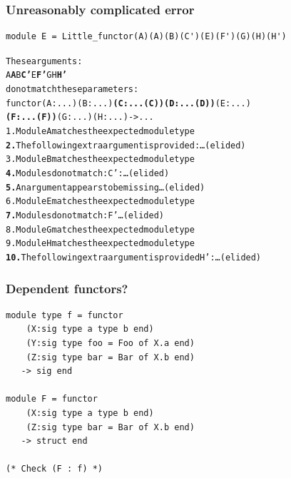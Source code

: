 \documentclass[11pt,aspectratio=169]{beamer}
\begin{document}
\begin{frame}[fragile]\frametitle{Unreasonably complicated error}
\begin{verbatim}
module E = Little_functor(A)(A)(B)(C')(E)(F')(G)(H)(H')
\end{verbatim}
  \footnotesize
\begin{alltt}
These arguments:
  {\color{green}{}A} {\color{red}{}\bfseries{}A} {\color{green}{}B} {\color{magenta}{}\bfseries{}C'} {\color{red}{}\bfseries{}} {\color{green}{}E} {\color{magenta}{}\bfseries{}F'} {\color{green}{}G} {\color{green}{}H} {\color{red}{}\bfseries{}H'}
do not match these parameters:
  functor {\color{green}{}(A : ...)} {\color{red}{}\bfseries{}} {\color{green}{}(B : ...)} {\color{magenta}{}\bfseries{}(C : ...(C))} {\color{red}{}\bfseries{}(D : ...(D))} {\color{green}{}(E : ...)}
  {\color{magenta}{}\bfseries{}(F : ...(F))} {\color{green}{}(G : ...)} {\color{green}{}(H : ...)} {\color{red}{}\bfseries{}} -> ...
{\color{green}{}1.} Module A matches the expected module type
{\color{red}{}\bfseries{}2.} The following extra argument is provided: \dots(elided)
{\color{green}{}3.} Module B matches the expected module type
{\color{magenta}{}\bfseries{}4.} Modules do not match: C' : \dots(elided)
{\color{red}{}\bfseries{}5.} An argument appears to be missing \dots(elided)
{\color{green}{}6.} Module E matches the expected module type
{\color{magenta}{}\bfseries{}7.} Modules do not match: F' \dots(elided)
{\color{green}{}8.} Module G matches the expected module type
{\color{green}{}9.} Module H matches the expected module type
{\color{red}{}\bfseries{}10.} The following extra argument is provided H' : \dots(elided)
\end{alltt}
\end{frame}



\begin{frame}[fragile]\frametitle{Dependent functors?}
\begin{verbatim}
module type f = functor
    (X:sig type a type b end)
    (Y:sig type foo = Foo of X.a end)
    (Z:sig type bar = Bar of X.b end)
   -> sig end

module F = functor
    (X:sig type a type b end)
    (Z:sig type bar = Bar of X.b end)
   -> struct end

(* Check (F : f) *)
\end{verbatim}
\end{frame}

\end{document}
